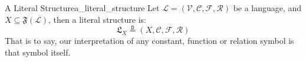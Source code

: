 \begin{definition}{A Literal Structure}{a_literal_structure}
Let $ \mathcal{ L } = \left( \mathcal{ V } , \mathcal{ C } , \mathcal{ F } , \mathcal{ R }      \right)    $   be a language,  and $ X \subseteq \mathfrak{ F }   \left( \mathcal{ L }   \right)$, then a literal structure is:
\[
\mathfrak{ L } _{ X }  \stackrel{\mathtt{D}}{=} \left( X , \mathcal{ C } , \mathcal{ F } , \mathcal{ R }     \right)  
\]
That is to say, our interpretation of any constant, function or relation symbol is that symbol itself.
\end{definition}
